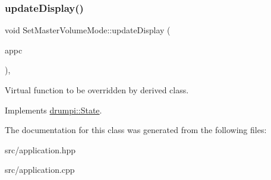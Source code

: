 \subsubsection{\texorpdfstring{update\+Display()}{updateDisplay()}}
{\footnotesize\ttfamily void Set\+Master\+Volume\+Mode\+::update\+Display (\begin{DoxyParamCaption}\item[{\hyperlink{classdrumpi_1_1ApplicationCallback}{Application\+Callback} $\ast$}]{appc }\end{DoxyParamCaption})\hspace{0.3cm}{\ttfamily [override]}, {\ttfamily [virtual]}}

Virtual function to be overridden by derived class. 

Implements \hyperlink{classdrumpi_1_1State_a400c5fc605ddec1e4fe18c361bf38ef2}{drumpi\+::\+State}.



The documentation for this class was generated from the following files\+:\begin{DoxyCompactItemize}
\item 
src/application.\+hpp\item 
src/application.\+cpp\end{DoxyCompactItemize}
